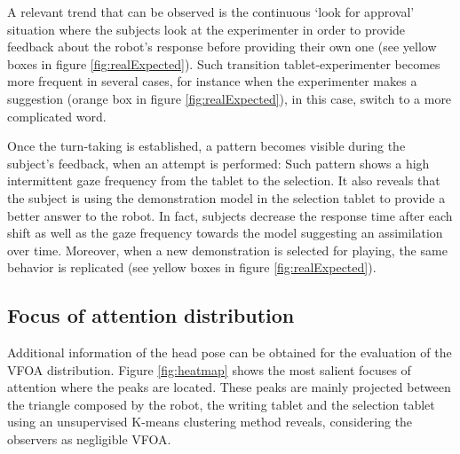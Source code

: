 \documentclass{sig-alternate}
\begin{document}
A relevant trend that can be observed is the continuous `look for approval'
situation where the subjects look at the experimenter in order to provide
feedback about the robot's response before providing their own one (see yellow
boxes in figure \ref{fig:realExpected}). Such transition tablet-experimenter
becomes more frequent in several cases, for instance when the experimenter makes
a suggestion (orange box in figure \ref{fig:realExpected}), in this case, switch
to a more complicated word.

Once the turn-taking is established, a pattern becomes visible during the
subject's feedback, when an attempt is performed: Such pattern shows a high
intermittent gaze frequency from the tablet to the selection. It also reveals
that the subject is using the demonstration model in the selection tablet to
provide a better answer to the robot. In fact, subjects decrease the response
time after each shift as well as the gaze frequency towards the model suggesting
an assimilation over time. Moreover, when a new demonstration is selected for
playing, the same behavior is replicated (see yellow boxes in figure
\ref{fig:realExpected}).

\subsection{Focus of attention distribution}

Additional information of the head pose can be obtained for the evaluation of
the VFOA distribution. Figure \ref{fig:heatmap} shows the most salient focuses
of attention where the peaks are located. These peaks are mainly projected
between the triangle composed by the robot, the writing tablet and the selection
tablet using an unsupervised K-means clustering method reveals, considering the
observers as negligible VFOA.
\end{document}
